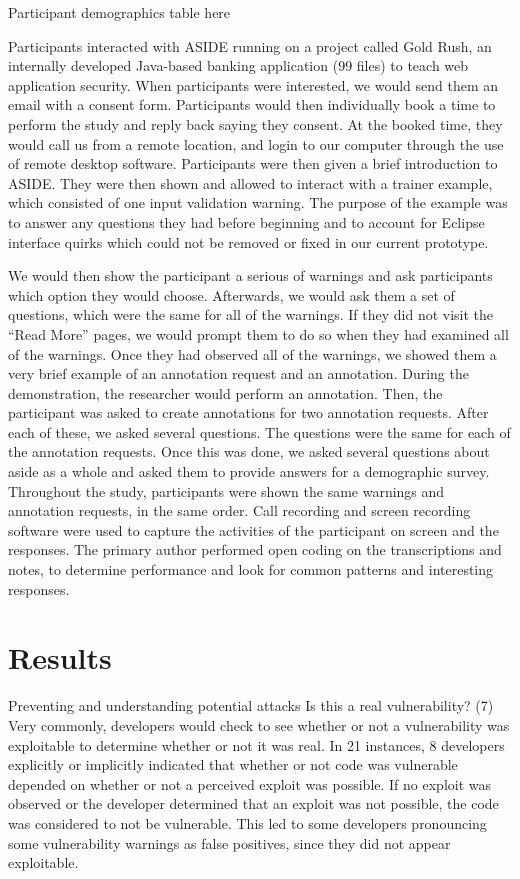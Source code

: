 \documentclass[twoside,letterpaper]{soups}
\begin{document}
Participant demographics table here

Participants interacted with ASIDE running on a project called Gold Rush, an internally developed Java-based banking application (99 files) to teach web application security. When participants were interested, we would send them an email with a consent form. Participants would then individually book a time to perform the study and reply back saying they consent. At the booked time, they would call us from a remote location, and login to our computer through the use of remote desktop software. Participants were then given a brief introduction to ASIDE. They were then shown and allowed to interact with a trainer example, which consisted of one input validation warning. The purpose of the example was to answer any questions they had before beginning and to account for Eclipse interface quirks which could not be removed or fixed in our current prototype.

We would then show the participant a serious of warnings and ask participants which option they would choose. Afterwards, we would ask them a set of questions, which were the same for all of the warnings. If they did not visit the ``Read More'' pages, we would prompt them to do so when they had examined all of the warnings. Once they had observed all of the warnings, we showed them a very brief example of an annotation request and an annotation. During the demonstration, the researcher would perform an annotation. Then, the participant was asked to create annotations for two annotation requests. After each of these, we asked several questions. The questions were the same for each of the annotation requests. Once this was done, we asked several questions about aside as a whole and asked them to provide answers for a demographic survey. Throughout the study, participants were shown the same warnings and annotation requests, in the same order. Call recording and screen recording software were used to capture the activities of the participant on screen and the responses. The primary author performed open coding on the transcriptions and notes, to determine performance and look for common patterns and interesting responses.


\section{Results}


Preventing and understanding potential attacks
Is this a real vulnerability? (7)		Very commonly, developers would check to see whether or not a vulnerability was exploitable to determine whether or not it was real. In 21 instances, 8 developers explicitly or implicitly indicated that whether or not code was vulnerable depended on whether or not a perceived exploit was possible. If no exploit was observed or the developer determined that an exploit was not possible, the code was considered to not be vulnerable. This led to some developers pronouncing some vulnerability warnings as false positives, since they did not appear exploitable. 
\end{document}
